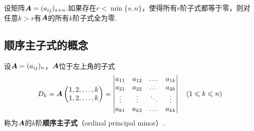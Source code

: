 \begin{property}
设矩阵\(\boldsymbol{A} = (a_{ij})_{s \times n}\).如果存在\(r < \min\{s,n\}\)，使得所有\(r\)阶子式都等于零，则对任意\(k > r\)有\(\boldsymbol{A}\)的所有\(k\)阶子式全为零.
\end{property}

\subsection{顺序主子式的概念}
\begin{definition}
设\(\boldsymbol{A}=(a_{ij})_n\)，\(\boldsymbol{A}\)位于左上角的子式\[
D_k = \boldsymbol{A}\begin{pmatrix}
1,2,\dotsc,k \\
1,2,\dotsc,k
\end{pmatrix} = \begin{vmatrix}
a_{11} & a_{12} & \dots & a_{1k} \\
a_{21} & a_{22} & \dots & a_{2k} \\
\vdots & \vdots & \ddots & \vdots \\
a_{k1} & a_{k2} & \dots & a_{kk}
\end{vmatrix}
\quad(1 \leqslant k \leqslant n)
\]称为\(\boldsymbol{A}\)的\(k\)阶\textbf{顺序主子式}（ordinal principal minor）.
\end{definition}

